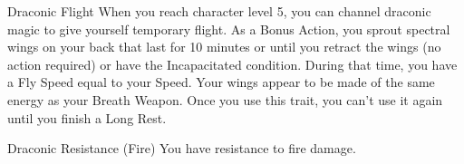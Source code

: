 \begin{DndComment}[]{Draconic Flight}
  When you reach character level 5, you can channel draconic magic to give yourself temporary flight. 
  As a Bonus Action, you sprout spectral wings on your back that last for 10 minutes or until you retract the wings (no action required) or have the Incapacitated condition. 
  During that time, you have a Fly Speed equal to your Speed. Your wings appear to be made of the same energy as your Breath Weapon. 
  Once you use this trait, you can’t use it again until you finish a Long Rest.
\end{DndComment}

\begin{DndComment}[]{Draconic Resistance (Fire)}
  You have resistance to fire damage.
\end{DndComment}

\endgroup

